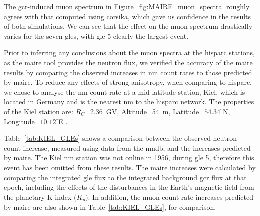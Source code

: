 The \gls{gcr}-induced muon spectrum in Figure~\ref{fig:MAIRE_muon_spectra} roughly agrees with that computed using \gls{corsika}, which gave us confidence in the results of both simulations. We can see that the effect on the muon spectrum drastically varies for the seven \glspl{gle}, with \gls{gle} 5 clearly the largest event.

Prior to inferring any conclusions about the muon spectra at the \gls{hisparc} stations, as the \gls{maire} tool provides the neutron flux, we verified the accuracy of the \gls{maire} results by comparing the observed increases in \gls{nm} count rates to those predicted by \gls{maire}. To reduce any effects of strong anisotropy, when comparing to \gls{hisparc}, we chose to analyse the \gls{nm} count rate at a mid-latitude station, Kiel, which is located in Germany and is the nearest \gls{nm} to the \gls{hisparc} network. The properties of the Kiel station are: $R_C$=2.36~GV, Altitude=54~m, Latitude=$54.34^{\circ}$N, Longitude=$10.12^{\circ}$E \citep{nmdb_nmdb_nodate}.

Table~\ref{tab:KIEL_GLEs} shows a comparison between the observed neutron count increase, measured using data from the \gls{nmdb}, and the increases predicted by \gls{maire}. The Kiel \gls{nm} station was not online in 1956, during \gls{gle} 5, therefore this event has been omitted from these results. The \gls{maire} increases were calculated by comparing the integrated \gls{gle} flux to the integrated background \gls{gcr} flux at that epoch, including the effects of the disturbances in the Earth's magnetic field from the planetary K-index ($K_p$). In addition, the muon count rate increases predicted by \gls{maire} are also shown in Table~\ref{tab:KIEL_GLEs}, for comparison.


